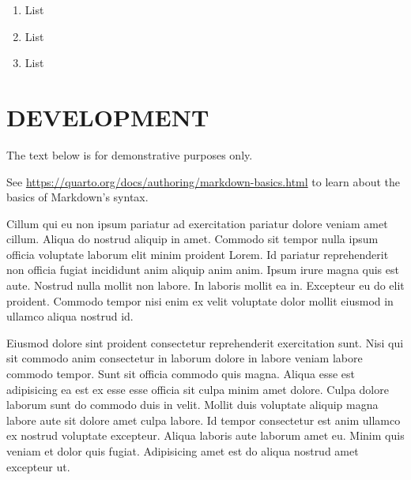 \documentclass[
  12pt,
  a4paper,
  oneside]{tesesusp}
\providecommand{\tightlist}{%
  \setlength{\itemsep}{0pt}\setlength{\parskip}{0pt}}\usepackage{longtable,booktabs,array}
\begin{document}
\begin{enumerate}
\def\labelenumi{\arabic{enumi}.}
\tightlist
\item
  List
\item
  List
\item
  List
\end{enumerate}


\hypertarget{development}{%
\chapter{DEVELOPMENT}\label{development}}

\begin{tcolorbox}[enhanced jigsaw, colback=white, colbacktitle=quarto-callout-warning-color!10!white, opacitybacktitle=0.6, title=\textcolor{quarto-callout-warning-color}{\faExclamationTriangle}\hspace{0.5em}{Warning}, titlerule=0mm, bottomtitle=1mm, bottomrule=.15mm, opacityback=0, left=2mm, coltitle=black, breakable, toptitle=1mm, arc=.35mm, colframe=quarto-callout-warning-color-frame, rightrule=.15mm, leftrule=.75mm, toprule=.15mm]

The text below is for demonstrative purposes only.

\vspace{5pt}

See \url{https://quarto.org/docs/authoring/markdown-basics.html} to
learn about the basics of Markdown's syntax.

\end{tcolorbox}

\vspace{10pt}

Cillum qui eu non ipsum pariatur ad exercitation pariatur dolore veniam
amet cillum. Aliqua do nostrud aliquip in amet. Commodo sit tempor nulla
ipsum officia voluptate laborum elit minim proident Lorem. Id pariatur
reprehenderit non officia fugiat incididunt anim aliquip anim anim.
Ipsum irure magna quis est aute. Nostrud nulla mollit non labore. In
laboris mollit ea in. Excepteur eu do elit proident. Commodo tempor nisi
enim ex velit voluptate dolor mollit eiusmod in ullamco aliqua nostrud
id.

Eiusmod dolore sint proident consectetur reprehenderit exercitation
sunt. Nisi qui sit commodo anim consectetur in laborum dolore in labore
veniam labore commodo tempor. Sunt sit officia commodo quis magna.
Aliqua esse est adipisicing ea est ex esse esse officia sit culpa minim
amet dolore. Culpa dolore laborum sunt do commodo duis in velit. Mollit
duis voluptate aliquip magna labore aute sit dolore amet culpa labore.
Id tempor consectetur est anim ullamco ex nostrud voluptate excepteur.
Aliqua laboris aute laborum amet eu. Minim quis veniam et dolor quis
fugiat. Adipisicing amet est do aliqua nostrud amet excepteur ut.
\end{document}
